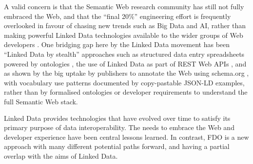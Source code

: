 A valid concern is that the Semantic Web research community has still not fully embraced the Web, and that the ``final 20\%'' engineering effort is frequently overlooked in favour of chasing new trends such as Big Data and AI, rather than making powerful Linked Data technologies available to the wider groups of Web developers \cite{Verborgh 2020}. One bridging gap here by the Linked Data movement has been ``Linked Data by stealth'' approaches such as structured data entry spreadsheets powered by ontologies \cite{Wolstencroft 2011}, the use of Linked Data as part of REST Web APIs \cite{Page 2011}, and as shown by the big uptake by publishers to annotate the Web using schema.org \cite{Bernstein 2016}, with vocabulary use patterns documented by copy-pastable JSON-LD examples, rather than by formalised ontologies or developer requirements to understand the full Semantic Web stack.

Linked Data provides technologies that have evolved over time to satisfy its primary purpose of data interoperability. The needs to embrace the Web and developer experience have been central lessons learned.  In contrast, FDO is a new approach with many different potential paths forward, and having a partial overlap with the aims of Linked Data.



